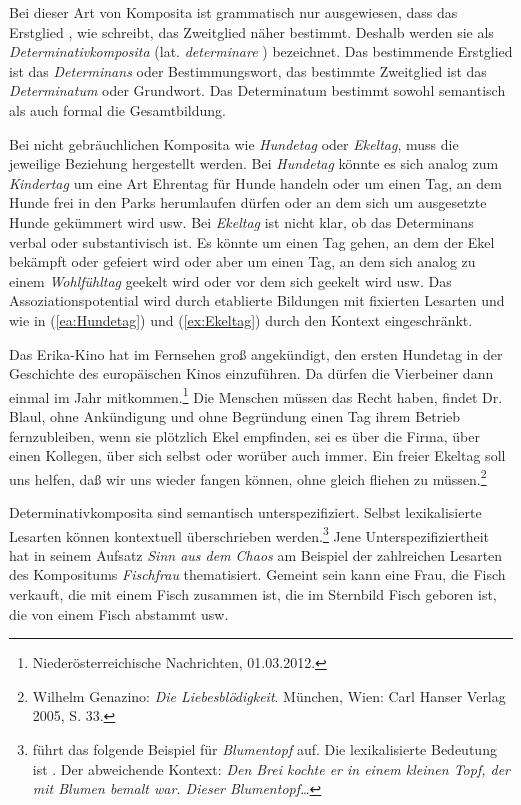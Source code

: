Bei dieser Art von Komposita ist grammatisch nur ausgewiesen, dass das Erstglied , wie \citet[8--9]{Paul1920Wb} schreibt, das Zweitglied näher bestimmt. Deshalb werden sie als \textit{Determinativkomposita} (lat. \textit{determinare} ) bezeichnet. Das bestimmende Erstglied ist das \textit{Determinans} oder Bestimmungswort, das bestimmte Zweitglied ist das \textit{Determinatum} oder Grundwort. Das Determinatum bestimmt sowohl semantisch als auch formal die Gesamtbildung.

Bei nicht gebräuchlichen Komposita wie \textit{Hundetag} oder \textit{Ekeltag}, muss die jeweilige Beziehung hergestellt werden. Bei \textit{Hundetag} könnte es sich analog zum \textit{Kindertag} um eine Art Ehrentag für Hunde handeln oder um einen Tag, an dem Hunde frei in den Parks herumlaufen dürfen oder an dem sich um ausgesetzte Hunde gekümmert wird usw. Bei \textit{Ekeltag} ist nicht klar, ob das Determinans verbal oder substantivisch ist. Es könnte um einen Tag gehen, an dem der Ekel bekämpft oder gefeiert wird oder aber um einen Tag, an dem sich analog zu einem \textit{Wohlfühltag} geekelt wird oder vor dem sich geekelt wird usw. Das Assoziationspotential wird durch etablierte Bildungen mit fixierten Lesarten und wie in (\ref{ea:Hundetag}) und (\ref{ex:Ekeltag}) durch den Kontext eingeschränkt.

\ea \label{ea:Kompositumadhoc}
\ea \label{ea:Hundetag} Das Erika-Kino hat im Fernsehen groß angekündigt, den ersten Hundetag in der Geschichte des europäischen Kinos einzuführen. Da dürfen die Vierbeiner dann einmal im Jahr mitkommen.\footnote{Niederösterreichische Nachrichten, 01.03.2012.}
\ex \label{ex:Ekeltag} Die Menschen müssen das Recht haben, findet Dr. Blaul, ohne Ankündigung und ohne Begründung einen Tag ihrem Betrieb fernzubleiben, wenn sie plötzlich Ekel empfinden, sei es über die Firma, über einen Kollegen, über sich selbst oder worüber auch immer. Ein freier Ekeltag soll uns helfen, daß wir uns wieder fangen können, ohne gleich fliehen zu müssen.\footnote{Wilhelm Genazino: \textit{Die Liebesblödigkeit}. München, Wien: Carl Hanser Verlag 2005, S. 33.}
\z 
\z 

Determinativkomposita sind semantisch unterspezifiziert. Selbst lexikalisierte Lesarten können kontextuell überschrieben werden.\footnote{\citet[13]{Schluecker2012} führt das folgende Beispiel für \textit{Blumentopf} auf. Die lexikalisierte Bedeutung ist . Der abweichende Kontext: \textit{Den Brei kochte er in einem kleinen Topf, der mit Blumen bemalt war. Dieser Blumentopf\ldots{}}} Jene Unterspezifiziertheit hat \citet[2]{Heringer1984Fischfrau} in seinem Aufsatz \textit{Sinn aus dem Chaos} am Beispiel der zahlreichen Lesarten des Kompositums \textit{Fischfrau} thematisiert. Gemeint sein kann eine Frau, die Fisch verkauft, die mit einem Fisch zusammen ist, die im Sternbild Fisch geboren ist, die von einem Fisch abstammt usw.

